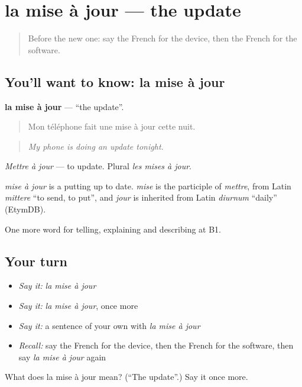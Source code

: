 \section[la mise à jour]{la mise à jour — the update}

\label{lesson:FR-C396-mise-a-jour}



\begin{quote}
Before the new one: say the French for the device, then the French for the software.
\end{quote}

\subsection*{You'll want to know: la mise à jour}
\textbf{la mise à jour} — \textquotedblleft{}the update\textquotedblright{}.

\begin{quote}
Mon téléphone fait une mise à jour cette nuit.
\end{quote}

\begin{quote}
\emph{My phone is doing an update tonight.}
\end{quote}

\emph{Mettre à jour} — to update. Plural \emph{les mises à jour}.

\begin{cousinweb}
\emph{mise à jour} is a putting up to date. \emph{mise} is the participle of \emph{mettre}, from Latin \emph{mittere} \textquotedblleft{}to send, to put\textquotedblright{}, and \emph{jour} is inherited from Latin \emph{diurnum} \textquotedblleft{}daily\textquotedblright{} (EtymDB).
\end{cousinweb}

\begin{grammarlens}[title={What you've built}]
One more word for telling, explaining and describing at B1.
\end{grammarlens}

\subsection*{Your turn}
\begin{itemize}
\raggedright
  \item \emph{Say it:} \emph{la mise à jour}
  \item \emph{Say it:} \emph{la mise à jour}, once more
  \item \emph{Say it:} a sentence of your own with \emph{la mise à jour}
  \item \emph{Recall:} say the French for the device, then the French for the software, then say \emph{la mise à jour} again
\end{itemize}

\begin{tcolorbox}[breakable,colback=teal!4,colframe=teal!35!black,title={Before you move on}]
What does la mise à jour mean? (\textquotedblleft{}The update\textquotedblright{}.) Say it once more.
\end{tcolorbox}
